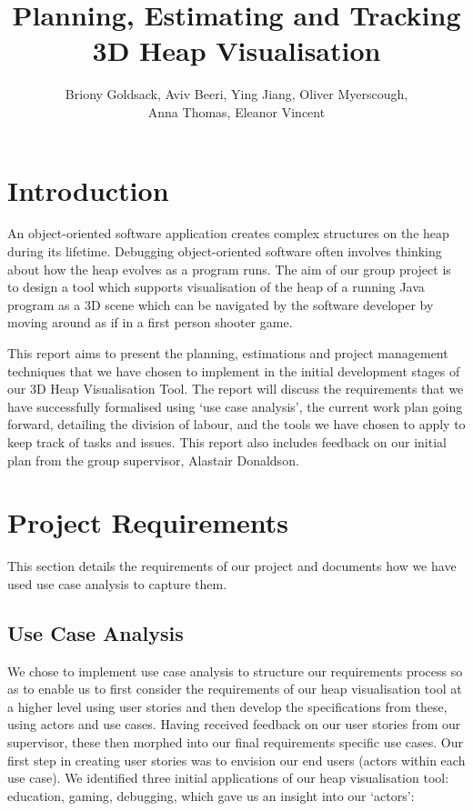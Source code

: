 \documentclass[10pt, a4paper]{article}
\begin{document}
\title{Planning, Estimating and Tracking
\\ 3D Heap Visualisation}
\author{Briony Goldsack, Aviv Beeri, Ying Jiang, Oliver Myerscough, 
\\ Anna Thomas, Eleanor Vincent}
\maketitle

\section{Introduction} 
An object-oriented software application creates complex structures on the heap during its lifetime. Debugging object-oriented software often involves thinking about how the heap evolves as a program runs. The aim of our group project is to design a tool which supports visualisation of the heap of a running Java program as a 3D scene which can be navigated by the software developer by moving around as if in a first person shooter game. 

This report aims to present the planning, estimations and project management techniques that we have chosen to implement in the initial development stages of our 3D Heap Visualisation Tool. The report will discuss the requirements that we have successfully formalised using ‘use case analysis’, the current work plan going forward, detailing the division of labour, and the tools we have chosen to apply to keep track of tasks and issues. This report also includes feedback on our initial plan from the group supervisor, Alastair Donaldson. 

\section{Project Requirements}
This section details the requirements of our project and documents how we have used use case analysis to capture them.

\subsection{Use Case Analysis}

We chose to implement use case analysis to structure our requirements process so as to enable us to first consider the requirements of our heap visualisation tool at a higher level using user stories and then develop the specifications from these, using actors and use cases. Having received feedback on our user stories from our supervisor, these then morphed into our final requirements specific use cases. Our first step in creating user stories was to envision our end users (actors within each use case). We identified three initial applications of our heap visualisation tool: education, gaming, debugging, which gave us an insight into our ‘actors’:
\end{document}
